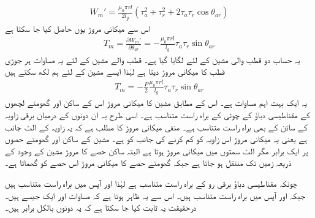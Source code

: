 \begin{align}
W_m'=\frac{\mu_0 \pi r l}{2 l_g} \left(\tau_a^2+\tau_r^2+2\tau_a \tau_r \cos \theta_{ar} \right) 
\end{align}
اس سے میکانی مروڑ یوں حاصل کیا جا سکتا ہے
\begin{align}
T_m=\frac{\partial W_m'}{\partial \theta_{ar}}=-\frac{\mu_0 \pi r l}{l_g} \tau_a \tau_r \sin \theta_{ar}
\end{align}
یہ حساب دو قطب والی مشین کے لئے لگایا گیا ہے۔ قطب والے مشین کے لئے یہ مساوات ہر جوڑی قطب کا میکانی مروڑ دیتا ہے لہٰذا ایسے مشین کے لئے ہم لکھ سکتے ہیں
\begin{align}
T_m=-\frac{P}{2}\frac{\mu_0 \pi r l}{l_g} \tau_a \tau_r \sin \theta_{ar}
\end{align}
یہ ایک بہت اہم مساوات ہے۔ اس کے مطابق مشین کا میکانی مروڑ اس کے ساکن اور گھومتے لچھوں کے مقناطیسی دباؤ کے چوٹی کے براہ راست متناسب ہے۔ اسی طرح یہ ان دونوں کے درمیان برقی زاویہ  کے سائن کے بھی براہ راست متناسب ہے۔ منفی میکانی مروڑ کا مطلب ہے کہ یہ زاویہ   کے الٹ جانب ہے یعنی یہ میکانی مروڑ اس زاویہ کو کم کرنے کی جانب کو ہے۔ مشین کے ساکن اور گھومتے حصوں پر ایک برابر مگر الٹ سمتوں میں میکانی مروڑ ہوتا ہے البتہ ساکن حصے کا مروڑ مشین کے وجود کے ذریعہ زمین تک منتقل ہو جاتا ہے جبکہ گھومتے حصے کا میکانی مروڑ اس حصے کو گھماتا ہے۔

چونکہ مقناطیسی دباؤ برقی رو کے براہ راست متناسب ہے لہٰذا   اور  آپس میں براہ راست متناسب ہیں جبکہ  اور  آپس میں براہ راست متناسب ہیں۔ اس سے یہ ظاہر ہوتا ہے کہ مساوات  اور  ایک جیسے ہیں۔ درحقیقت یہ ثابت کیا جا سکتا ہے کہ یہ دونوں بالکل برابر ہیں۔

